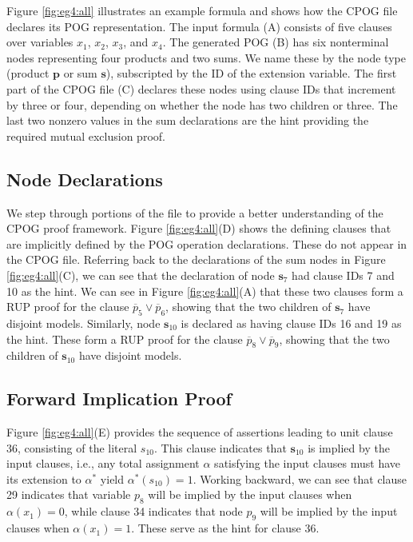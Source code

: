 \documentclass[twoside,11pt]{article}
\newcommand{\obar}[1]{\overline{#1}}
\newcommand{\extend}[1]{#1^{*}}
\newcommand{\assign}{\alpha}
\newcommand{\eassign}{\extend{\alpha}}
\newcommand{\makenode}[1]{\mathbf{#1}}
\newcommand{\nodes}{\makenode{s}}
\newcommand{\nodep}{\makenode{p}}
\begin{document}
Figure \ref{fig:eg4:all} illustrates an example formula and shows how
the CPOG file declares its POG representation.  The input formula (A)
consists of five clauses over variables $x_1$, $x_2$, $x_3$, and
$x_4$.  The generated POG (B) has six nonterminal nodes representing
four products and two sums.  We name these by the node
type (product $\nodep$ or sum $\nodes$), subscripted by the ID of the
extension variable.
  The first part of the CPOG file (C) declares
these nodes using clause IDs that increment by three or four,
depending on whether the node has two children or three.  The last two
nonzero values in the sum declarations are the hint providing the
required mutual exclusion proof.

\subsection{Node Declarations}

We step through portions of the file to provide a better understanding of the CPOG proof framework.
Figure
\ref{fig:eg4:all}(D) shows the defining clauses that are implicitly
defined by the POG operation declarations.  These do not appear in the
CPOG file.  Referring back to the declarations of the sum nodes in
Figure \ref{fig:eg4:all}(C), we can see that the declaration of node
$\nodes_7$ had clause IDs 7 and 10 as the hint.  We can see in Figure
\ref{fig:eg4:all}(A) that these two clauses form a RUP proof for the clause
$\obar{p}_5 \lor \obar{p}_6$, showing that the two children of $\nodes_7$
have disjoint models.  Similarly, node $\nodes_{10}$ is declared as having
clause IDs 16 and 19 as the hint.  These form a RUP proof for the clause
$\obar{p}_8 \lor \obar{p}_9$, showing that the two children of
$\nodes_{10}$ have disjoint models.

\subsection{Forward Implication Proof}

Figure \ref{fig:eg4:all}(E) provides the sequence of assertions
leading to unit clause 36, consisting of the literal $s_{10}$.  This clause indicates that $\nodes_{10}$ is implied by the input clauses, i.e.,
any total assignment $\assign$
satisfying the input clauses must have its extension to $\eassign$ yield $\eassign(s_{10}) = 1$.
Working backward, we can see that
clause 29 indicates that variable $p_8$ will be implied by the input
clauses when $\assign(x_1) = 0$, while clause 34 indicates that node $p_9$ will
be implied by the input clauses when $\assign(x_1) = 1$.  These serve as the
hint for clause 36.
\end{document}
